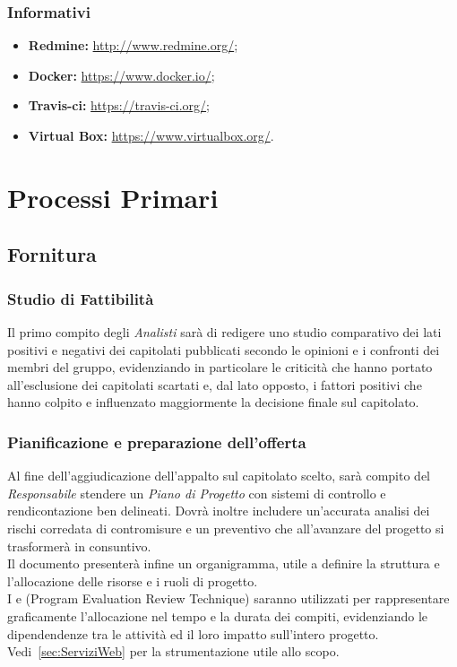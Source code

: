 \documentclass{scalatekids-article}
\begin{document}
\subsubsection{Informativi}

\begin{itemize}
    \item\textbf{Redmine:} \url{http://www.redmine.org/};
    \item\textbf{Docker:} \url{https://www.docker.io/};
    \item\textbf{Travis-ci:} \url{https://travis-ci.org/};
    \item\textbf{Virtual Box:} \url{https://www.virtualbox.org/}.
\end{itemize}

\section{Processi Primari}

\subsection{Fornitura}

\subsubsection{Studio di Fattibilità}

Il primo compito degli \textit{Analisti} sarà di redigere uno studio comparativo
dei lati positivi e negativi dei capitolati pubblicati secondo le opinioni e i
confronti dei membri del gruppo, evidenziando in particolare le criticità che
hanno portato all'esclusione dei capitolati scartati e, dal lato opposto, i
fattori positivi che hanno colpito e influenzato maggiormente la decisione
finale sul capitolato.

\subsubsection{Pianificazione e preparazione dell'offerta}

Al fine dell'aggiudicazione dell'appalto sul capitolato scelto, sarà compito del
\textit{Responsabile} stendere un \textit{Piano di Progetto} con sistemi di
controllo e rendicontazione ben delineati. Dovrà inoltre includere un'accurata
analisi dei rischi corredata di contromisure e un preventivo che all'avanzare
del progetto si trasformerà in consuntivo.\\
Il documento presenterà infine un organigramma, utile a definire la struttura
e l'allocazione delle risorse e i ruoli di progetto.\\
I  e  (Program Evaluation Review
Technique) saranno utilizzati per rappresentare graficamente l'allocazione nel
tempo e la durata dei compiti, evidenziando le dipendendenze tra le attività ed
il loro impatto sull'intero progetto.\\
Vedi~\ref{sec:ServiziWeb} per la strumentazione utile allo scopo.
\end{document}
